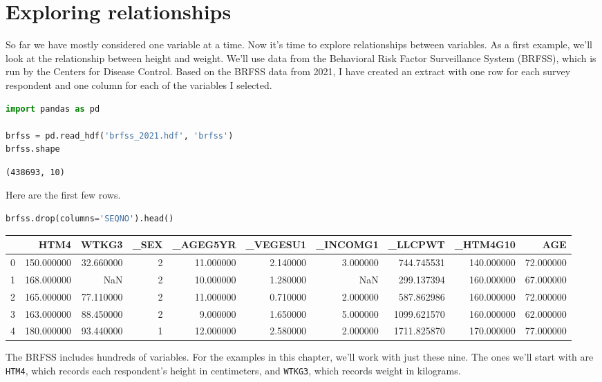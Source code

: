\documentclass[
]{book}
\newcommand{\passthrough}[1]{#1}
\begin{document}
\section{Exploring relationships}\label{exploring-relationships}

So far we have mostly considered one variable at a time. Now it's time
to explore relationships between variables. As a first example, we'll
look at the relationship between height and weight. We'll use data from
the Behavioral Risk Factor Surveillance System (BRFSS), which is run by
the Centers for Disease Control. Based on the BRFSS data from 2021, I
have created an extract with one row for each survey respondent and one
column for each of the variables I selected.

\begin{lstlisting}[language=Python]
import pandas as pd

brfss = pd.read_hdf('brfss_2021.hdf', 'brfss')
brfss.shape
\end{lstlisting}

\begin{lstlisting}
(438693, 10)
\end{lstlisting}

Here are the first few rows.

\begin{lstlisting}[language=Python]
brfss.drop(columns='SEQNO').head()
\end{lstlisting}

\begin{tabular}{lrrrrrrrrr}
\toprule
 & HTM4 & WTKG3 & \_SEX & \_AGEG5YR & \_VEGESU1 & \_INCOMG1 & \_LLCPWT & \_HTM4G10 & AGE \\
\midrule
0 & 150.000000 & 32.660000 & 2 & 11.000000 & 2.140000 & 3.000000 & 744.745531 & 140.000000 & 72.000000 \\
1 & 168.000000 & NaN & 2 & 10.000000 & 1.280000 & NaN & 299.137394 & 160.000000 & 67.000000 \\
2 & 165.000000 & 77.110000 & 2 & 11.000000 & 0.710000 & 2.000000 & 587.862986 & 160.000000 & 72.000000 \\
3 & 163.000000 & 88.450000 & 2 & 9.000000 & 1.650000 & 5.000000 & 1099.621570 & 160.000000 & 62.000000 \\
4 & 180.000000 & 93.440000 & 1 & 12.000000 & 2.580000 & 2.000000 & 1711.825870 & 170.000000 & 77.000000 \\
\bottomrule
\end{tabular}

The BRFSS includes hundreds of variables. For the examples in this
chapter, we'll work with just these nine. The ones we'll start with are
\passthrough{\lstinline!HTM4!}, which records each respondent's height
in centimeters, and \passthrough{\lstinline!WTKG3!}, which records
weight in kilograms.
\end{document}
